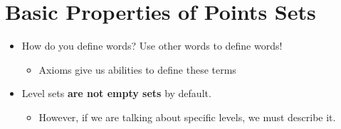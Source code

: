 \documentclass[12pt]{article}
\begin{document}
\section{Basic Properties of Points Sets}

\begin{itemize}
    \item How do you define words? Use other words to define words!
    \begin{itemize}
        \item Axioms give us abilities to define these terms
    \end{itemize}

    \item Level sets \textbf{are not empty sets} by default.
    \begin{itemize}
        \item However, if we are talking about specific levels, we must describe it.
    \end{itemize}
\end{itemize}
\end{document}
